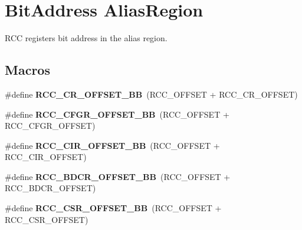 \hypertarget{group___r_c_c___bit_address___alias_region}{}\section{Bit\+Address Alias\+Region}
\label{group___r_c_c___bit_address___alias_region}


R\+CC registers bit address in the alias region.  


\subsection*{Macros}
\begin{DoxyCompactItemize}
\item 
\mbox{\label{group___r_c_c___bit_address___alias_region_gacda2a01fba2f4f6b28d6533aef2f2396}} 
\#define {\bfseries R\+C\+C\+\_\+\+C\+R\+\_\+\+O\+F\+F\+S\+E\+T\+\_\+\+BB}~(R\+C\+C\+\_\+\+O\+F\+F\+S\+ET + R\+C\+C\+\_\+\+C\+R\+\_\+\+O\+F\+F\+S\+ET)
\item 
\mbox{\label{group___r_c_c___bit_address___alias_region_gaff4bdac027bca99768bdbdd4bd794abc}} 
\#define {\bfseries R\+C\+C\+\_\+\+C\+F\+G\+R\+\_\+\+O\+F\+F\+S\+E\+T\+\_\+\+BB}~(R\+C\+C\+\_\+\+O\+F\+F\+S\+ET + R\+C\+C\+\_\+\+C\+F\+G\+R\+\_\+\+O\+F\+F\+S\+ET)
\item 
\mbox{\label{group___r_c_c___bit_address___alias_region_gae509d1d4d3915d2d95b0c141e09a8fd2}} 
\#define {\bfseries R\+C\+C\+\_\+\+C\+I\+R\+\_\+\+O\+F\+F\+S\+E\+T\+\_\+\+BB}~(R\+C\+C\+\_\+\+O\+F\+F\+S\+ET + R\+C\+C\+\_\+\+C\+I\+R\+\_\+\+O\+F\+F\+S\+ET)
\item 
\mbox{\label{group___r_c_c___bit_address___alias_region_ga3dc42f75899d92ca31a9ca30609ac43a}} 
\#define {\bfseries R\+C\+C\+\_\+\+B\+D\+C\+R\+\_\+\+O\+F\+F\+S\+E\+T\+\_\+\+BB}~(R\+C\+C\+\_\+\+O\+F\+F\+S\+ET + R\+C\+C\+\_\+\+B\+D\+C\+R\+\_\+\+O\+F\+F\+S\+ET)
\item 
\mbox{\label{group___r_c_c___bit_address___alias_region_gad07932326df75b09ed7c43233a7c6666}} 
\#define {\bfseries R\+C\+C\+\_\+\+C\+S\+R\+\_\+\+O\+F\+F\+S\+E\+T\+\_\+\+BB}~(R\+C\+C\+\_\+\+O\+F\+F\+S\+ET + R\+C\+C\+\_\+\+C\+S\+R\+\_\+\+O\+F\+F\+S\+ET)

\end{DoxyCompactItemize}
